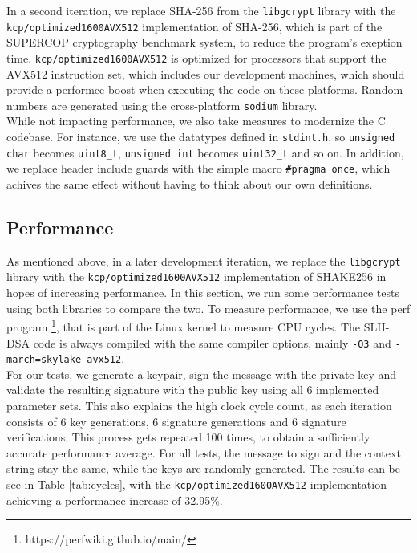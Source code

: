 \documentclass[journal=tosc,notanonymous]{iacrtrans}
\begin{document}
In a second iteration, we replace SHA-256 from the \texttt{libgcrypt} library with the \texttt{kcp/optimized1600AVX512} implementation of SHA-256, which is part of the SUPERCOP cryptography benchmark system, to reduce the program's exeption time.
\texttt{kcp/optimized1600AVX512} is optimized for processors that support the AVX512 instruction set, which includes our development machines, which should provide a performce boost when executing the code on these platforms.
Random numbers are generated using the cross-platform \texttt{sodium} library.
\\
While not impacting performance, we also take measures to modernize the C codebase.
For instance, we use the datatypes defined in \texttt{stdint.h}, so \texttt{unsigned char} becomes \texttt{uint8\_t}, \texttt{unsigned int} becomes \texttt{uint32\_t} and so on.
In addition, we replace header include guards with the simple macro \texttt{\#pragma once}, which achives the same effect without having to think about our own definitions.


\subsection{Performance}

As mentioned above, in a later development iteration, we replace the \texttt{libgcrypt} library with the \texttt{kcp/optimized1600AVX512} implementation of SHAKE256 in hopes of increasing performance.
In this section, we run some performance tests using both libraries to compare the two.
To measure performance, we use the perf program \footnote{https://perfwiki.github.io/main/}, that is part of the Linux kernel to measure CPU cycles.
The SLH-DSA code is always compiled with the same compiler options, mainly \texttt{-O3} and \texttt{-march=skylake-avx512}.
\\
For our tests, we generate a keypair, sign the message with the private key and validate the resulting signature with the public key using all 6 implemented parameter sets.
This also explains the high clock cycle count, as each iteration consists of 6 key generations, 6 signature generations and 6 signature verifications.
This process gets repeated 100 times, to obtain a sufficiently accurate performance average.
For all tests, the message to sign and the context string stay the same, while the keys are randomly generated.
The results can be see in Table \ref{tab:cycles}, with the \texttt{kcp/optimized1600AVX512} implementation achieving a performance increase of 32.95\%.
\end{document}

